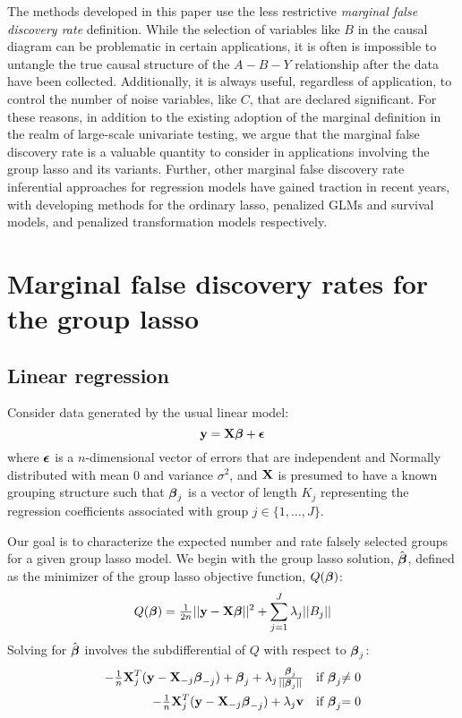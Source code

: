 The methods developed in this paper use the less restrictive \textit{marginal false discovery rate} definition. While the selection of variables like $B$ in the causal diagram can be problematic in certain applications, it is often is impossible to untangle the true causal structure of the $A-B-Y$ relationship after the data have been collected. Additionally, it is always useful, regardless of application, to control the number of noise variables, like $C$, that are declared significant. For these reasons, in addition to the existing adoption of the marginal definition in the realm of large-scale univariate testing, we argue that the marginal false discovery rate is a valuable quantity to consider in applications involving the group lasso and its variants. Further, other marginal false discovery rate inferential approaches for regression models have gained traction in recent years, with \citet{Breheny2019, Miller2019, Liang2021} developing methods for the ordinary lasso, penalized GLMs and survival models, and penalized transformation models respectively.

\section{Marginal false discovery rates for the group lasso}
\label{Sec:main_meth}

\subsection{Linear regression}

Consider data generated by the usual linear model:
\begin{equation}
\mathbf{y} = \mathbf{X}\boldsymbol{\beta} + \boldsymbol{\epsilon}
\end{equation}
where $\boldsymbol{\epsilon}$ is a $n$-dimensional vector of errors that are independent and Normally distributed with mean 0 and variance $\sigma^2$, and $\mathbf{X}$ is presumed to have a known grouping structure such that $\boldsymbol{\beta}_j$ is a vector of length $K_j$ representing the regression coefficients associated with group $j \in \{1, \ldots, J\}$. 

Our goal is to characterize the expected number and rate falsely selected groups for a given group lasso model. We begin with the group lasso solution, $\hat{\boldsymbol{\beta}}$, defined as the minimizer of the group lasso objective function, $Q(\boldsymbol{\beta})$:
\begin{equation}
Q(\boldsymbol{\beta}) = \tfrac{1}{2n}||\mathbf{y} - \mathbf{X}\boldsymbol{\beta}||^2 + \sum_{j = 1}^{J}\lambda_j ||B_j||
\end{equation}
Solving for $\hat{\boldsymbol{\beta}}$ involves the subdifferential of $Q$ with respect to $\boldsymbol{\beta}_j$:
\begin{equation}
\label{eq:kkt}
\begin{alignedat}{2}
-\tfrac{1}{n}\mathbf{X}_j^T(\mathbf{y} - \mathbf{X}_{-j}\boldsymbol{\beta}_{-j}) + \boldsymbol{\beta}_j + \lambda_j\tfrac{\boldsymbol{\beta}_j}{||\boldsymbol{\beta}_j||} &\quad \text{if } \boldsymbol{\beta}_j &\neq 0 \\
-\tfrac{1}{n}\mathbf{X}_j^T(\mathbf{y} - \mathbf{X}_{-j}\boldsymbol{\beta}_{-j}) + \lambda_j\mathbf{v} &\quad \text{if } \boldsymbol{\beta}_j &= 0
\end{alignedat}
\end{equation}

